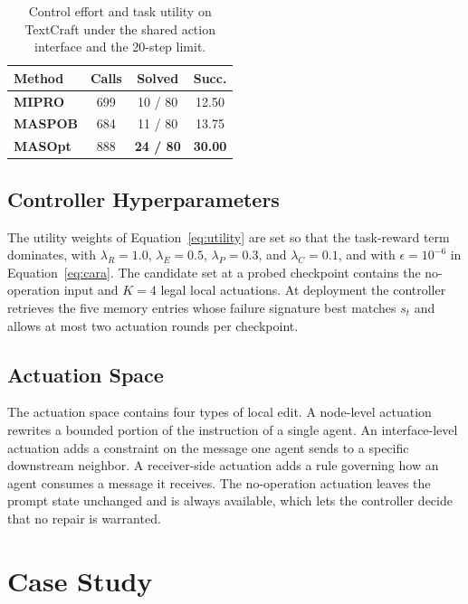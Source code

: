 \documentclass{article}
\theoremstyle{definition}
\begin{document}
\begin{table}[!htbp]
    \centering
    \caption{Control effort and task utility on TextCraft under the shared action interface and the 20-step limit.}
    \label{tab:cost}
    \small
    \setlength{\tabcolsep}{5pt}
    \begin{tabular}{@{}lccc@{}}
        \toprule
        \textbf{Method} & \textbf{Calls} & \textbf{Solved} & \textbf{Succ.} \\
        \midrule
        \textbf{MIPRO} & 699 & 10 / 80 & 12.50 \\
        \textbf{MASPOB} & 684 & 11 / 80 & 13.75 \\
        \midrule
        \rowcolor{gray!15}\textbf{MASOpt} & 888 & \textbf{24 / 80} & \textbf{30.00} \\
        \bottomrule
    \end{tabular}
\end{table}

\subsection{Controller Hyperparameters}
\label{app:hyper}

The utility weights of Equation~\ref{eq:utility} are set so that the task-reward term dominates, with $\lambda_R = 1.0$, $\lambda_E = 0.5$, $\lambda_P = 0.3$, and $\lambda_C = 0.1$, and with $\epsilon = 10^{-6}$ in Equation~\ref{eq:cara}. The candidate set at a probed checkpoint contains the no-operation input and $K = 4$ legal local actuations. At deployment the controller retrieves the five memory entries whose failure signature best matches $s_t$ and allows at most two actuation rounds per checkpoint.

\subsection{Actuation Space}
\label{app:actuation}

The actuation space contains four types of local edit. A node-level actuation rewrites a bounded portion of the instruction of a single agent. An interface-level actuation adds a constraint on the message one agent sends to a specific downstream neighbor. A receiver-side actuation adds a rule governing how an agent consumes a message it receives. The no-operation actuation leaves the prompt state unchanged and is always available, which lets the controller decide that no repair is warranted.

\section{Case Study}
\label{app:case}

\end{document}
